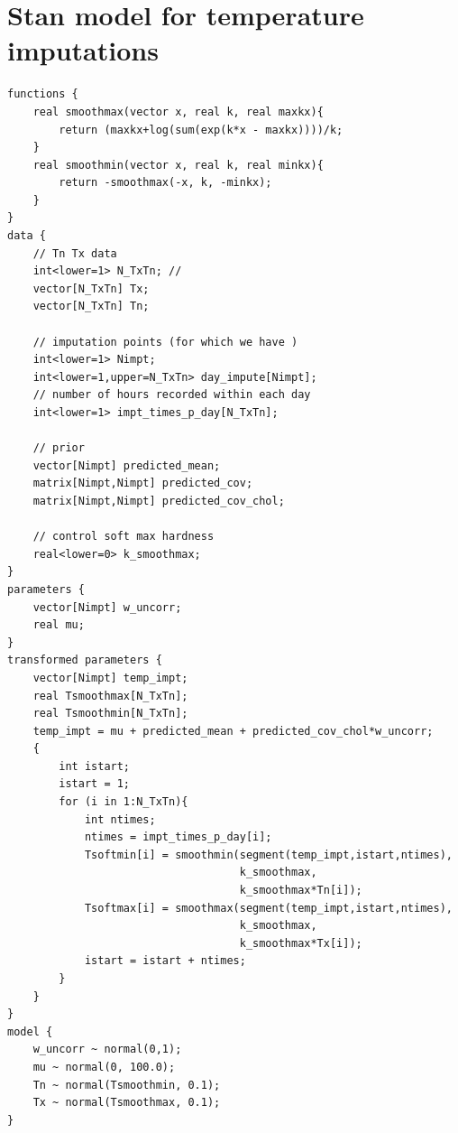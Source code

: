 \documentclass[letter]{article}
\begin{document}
        \section{Stan model for temperature imputations}\label{stan-model-for-temperature-imputations}
    

\label{sec:appendix_stan}
        \begin{verbatim}
functions {
    real smoothmax(vector x, real k, real maxkx){
        return (maxkx+log(sum(exp(k*x - maxkx))))/k;
    }
    real smoothmin(vector x, real k, real minkx){
        return -smoothmax(-x, k, -minkx);
    }
}
data {
    // Tn Tx data
    int<lower=1> N_TxTn; //
    vector[N_TxTn] Tx;
    vector[N_TxTn] Tn;

    // imputation points (for which we have )
    int<lower=1> Nimpt;
    int<lower=1,upper=N_TxTn> day_impute[Nimpt];
    // number of hours recorded within each day
    int<lower=1> impt_times_p_day[N_TxTn];

    // prior 
    vector[Nimpt] predicted_mean;
    matrix[Nimpt,Nimpt] predicted_cov;
    matrix[Nimpt,Nimpt] predicted_cov_chol;

    // control soft max hardness
    real<lower=0> k_smoothmax;
}
parameters {
    vector[Nimpt] w_uncorr;
    real mu;
}
transformed parameters {
    vector[Nimpt] temp_impt;
    real Tsmoothmax[N_TxTn];
    real Tsmoothmin[N_TxTn];  
    temp_impt = mu + predicted_mean + predicted_cov_chol*w_uncorr;
    {
        int istart;
        istart = 1;
        for (i in 1:N_TxTn){
            int ntimes;
            ntimes = impt_times_p_day[i];
            Tsoftmin[i] = smoothmin(segment(temp_impt,istart,ntimes), 
                                    k_smoothmax, 
                                    k_smoothmax*Tn[i]);
            Tsoftmax[i] = smoothmax(segment(temp_impt,istart,ntimes), 
                                    k_smoothmax,
                                    k_smoothmax*Tx[i]);
            istart = istart + ntimes;
        }
    }
}
model {
    w_uncorr ~ normal(0,1);
    mu ~ normal(0, 100.0);
    Tn ~ normal(Tsmoothmin, 0.1);
    Tx ~ normal(Tsmoothmax, 0.1);
}
\end{verbatim}
    



    
    



    
    
\end{document}
